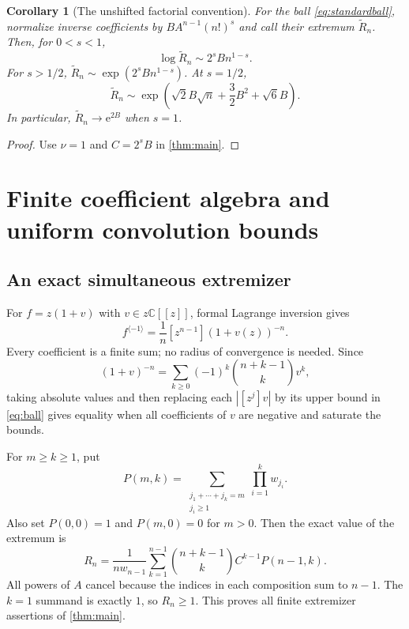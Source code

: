 \documentclass[11pt,a4paper]{article}
\newtheorem{corollary}[theorem]{Corollary}
\theoremstyle{definition}
\theoremstyle{remark}
\newcommand{\C}{\mathbb C}
\newcommand{\ee}{\mathrm e}
\newcommand{\inv}{^{\langle-1\rangle}}
\numberwithin{equation}{section}
\begin{document}
\begin{corollary}[The unshifted factorial convention]\label{cor:unshifted}
For the ball \eqref{eq:standardball}, normalize inverse coefficients by
$B A^{n-1}(n!)^s$ and call their extremum $\widetilde R_n$.
Then, for $0<s<1$,
\[
 \log\widetilde R_n\sim 2^s B n^{1-s}.
\]
For $s>1/2$, $\widetilde R_n\sim\exp(2^sBn^{1-s})$. At $s=1/2$,
\[
 \widetilde R_n\sim
 \exp\left(\sqrt2 B\sqrt n+\frac32 B^2+\sqrt6 B\right).
\]
In particular, $\widetilde R_n\to\ee^{2B}$ when $s=1$.
\end{corollary}
\begin{proof}
Use $\nu=1$ and $C=2^sB$ in \cref{thm:main}.
\end{proof}

\section{Finite coefficient algebra and uniform convolution bounds}
\label{sec:finite}

\subsection{An exact simultaneous extremizer}
For $f=z(1+v)$ with $v\in z\C[[z]]$, formal Lagrange inversion gives
\begin{equation}
 [z^n]f\inv=\frac1n[z^{n-1}](1+v(z))^{-n}.
 \label{eq:lagrange}
\end{equation}
Every coefficient is a finite sum; no radius of convergence is needed.
Since
\[
 (1+v)^{-n}=\sum_{k\ge0}(-1)^k\binom{n+k-1}{k}v^k,
\]
taking absolute values and then replacing each $|[z^j]v|$ by its upper
bound in \eqref{eq:ball} gives equality when all coefficients of $v$ are
negative and saturate the bounds.

For $m\ge k\ge1$, put
\begin{equation}
 P(m,k)=\sum_{\substack{j_1+\cdots+j_k=m\\j_i\ge1}}
                   \prod_{i=1}^k w_{j_i}.
 \label{eq:convolution}
\end{equation}
Also set $P(0,0)=1$ and $P(m,0)=0$ for $m>0$.
Then the exact value of the extremum is
\begin{equation}
 R_n=\frac{1}{n w_{n-1}}
 \sum_{k=1}^{n-1}\binom{n+k-1}{k}C^{k-1}P(n-1,k).
 \label{eq:exactR}
\end{equation}
All powers of $A$ cancel because the indices in each composition sum to
$n-1$. The $k=1$ summand is exactly $1$, so $R_n\ge1$. This proves
all finite extremizer assertions of \cref{thm:main}.
\end{document}

